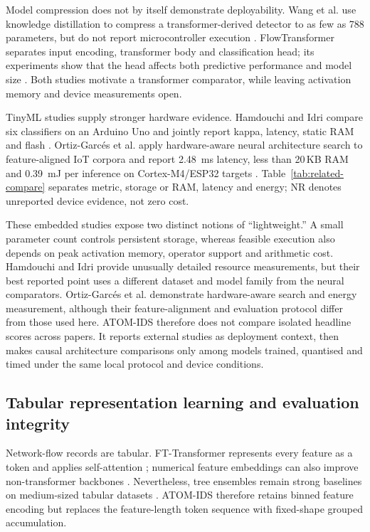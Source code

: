 \documentclass[10pt,letterpaper,twocolumn]{article}
\begin{document}
Model compression does not by itself demonstrate deployability. Wang et al.
use knowledge distillation to compress a transformer-derived detector to as
few as 788 parameters, but do not report microcontroller execution
\cite{wang2024theseus}. FlowTransformer separates input encoding, transformer
body and classification head; its experiments show that the head affects both
predictive performance and model size \cite{manocchio2024flowtransformer}.
Both studies motivate a transformer comparator, while leaving activation
memory and device measurements open.

TinyML studies supply stronger hardware evidence. Hamdouchi and Idri compare
six classifiers on an Arduino Uno and jointly report kappa, latency, static RAM
and flash \cite{hamdouchi2025tinyml}. Ortiz-Garc\'{e}s et al. apply
hardware-aware neural architecture search to feature-aligned IoT corpora and
report \SI{2.48}{\milli\second} latency, less than 20\,KB RAM and
\SI{0.39}{\milli\joule} per inference on Cortex-M4/ESP32 targets
\cite{ortizgarces2026nas}. Table~\ref{tab:related-compare} separates metric,
storage or RAM, latency and energy; NR denotes unreported device evidence, not
zero cost.

These embedded studies expose two distinct notions of ``lightweight.'' A small
parameter count controls persistent storage, whereas feasible execution also
depends on peak activation memory, operator support and arithmetic cost.
Hamdouchi and Idri provide unusually detailed resource measurements, but their
best reported point uses a different dataset and model family from the neural
comparators. Ortiz-Garc\'{e}s et al. demonstrate hardware-aware search and
energy measurement, although their feature-alignment and evaluation protocol
differ from those used here. ATOM-IDS therefore does not compare isolated
headline scores across papers. It reports external studies as deployment
context, then makes causal architecture comparisons only among models trained,
quantised and timed under the same local protocol and device conditions.

\subsection{Tabular representation learning and evaluation integrity}
\label{sec.related.tabular}

Network-flow records are tabular. FT-Transformer represents every feature as a
token and applies self-attention \cite{gorishniy2021revisiting}; numerical
feature embeddings can also improve non-transformer backbones
\cite{gorishniy2022embeddings}. Nevertheless, tree ensembles remain strong
baselines on medium-sized tabular datasets \cite{grinsztajn2022why}. ATOM-IDS
therefore retains binned feature encoding but replaces the feature-length token
sequence with fixed-shape grouped accumulation.
\end{document}
